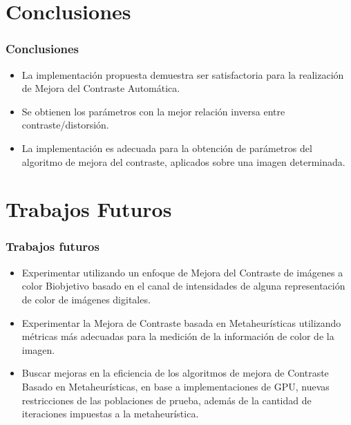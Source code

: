\documentclass[usenames,dvipsnames]{beamer}
\begin{document}
\section{Conclusiones}

\begin{frame}
\frametitle{Conclusiones} 
\begin{exampleblock}{}
\begin{itemize}
	\item La implementación propuesta demuestra ser satisfactoria para la realización de Mejora del Contraste Automática.
	\item Se obtienen los parámetros con la mejor relación inversa entre contraste/distorsión.
	\item La implementación es adecuada para la obtención de parámetros del algoritmo de mejora del contraste, aplicados sobre una imagen determinada.
\end{itemize}
\end{exampleblock}
\end{frame}


\section{Trabajos Futuros}

\begin{frame}
\frametitle{Trabajos futuros} 
\begin{exampleblock}{}
\begin{itemize}
	\item Experimentar utilizando un enfoque de Mejora del Contraste de imágenes a color Biobjetivo basado en el canal de intensidades de alguna representación de color de imágenes digitales.
	\item Experimentar la Mejora de Contraste basada en Metaheurísticas utilizando métricas más adecuadas para la medición de la información de color de la imagen.
	\item Buscar mejoras en la eficiencia de los algoritmos de mejora de Contraste Basado en Metaheurísticas, en base a implementaciones de GPU, nuevas restricciones de las poblaciones de prueba, además de la cantidad de iteraciones impuestas a la metaheurística.
\end{itemize}
\end{exampleblock}
\end{frame}
\end{document}
